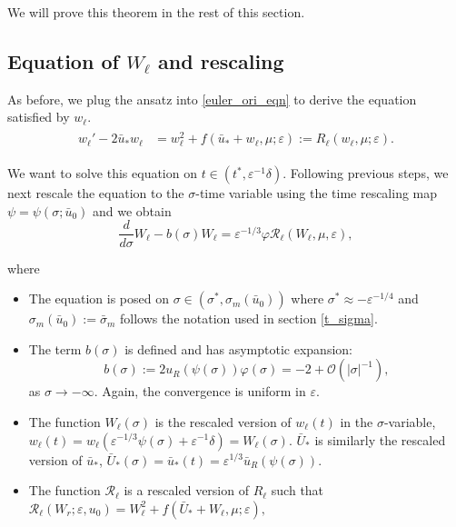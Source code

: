 \documentclass[letterpaper,11pt]{article}
\newcommand{\Ral}{\mathcal{R}}
\newcommand{\rmO}{\mathcal{O}}
\newcommand{\eps}{\varepsilon}
\numberwithin{equation}{section}
\theoremstyle{plain}
\begin{document}
We will prove this theorem in the rest of this section.
\subsection{Equation of \texorpdfstring{$W_{\ell}$}{Well} and rescaling}

As before, we plug the ansatz into \eqref{euler_ori_eqn} to derive the equation satisfied by $w_\ell$.
\begin{align}\label{Eqn_wl}
\begin{split}
w_{\ell}' -2\bar{u}_* w_\ell &= w_\ell^2 + f(\bar{u}_*+w_\ell, \mu; \eps):=R_\ell(w_\ell,\mu;\eps).
\end{split}
\end{align}

We want to solve this equation on $t\in (t^*, \eps^{-1}\delta)$. 
Following previous steps, we next rescale the equation to the $\sigma$-time variable using the time rescaling map $\psi = \psi(\sigma; \bar{u}_0)$ and we obtain
\begin{equation}\label{rescl_wl}
\frac{d}{d\sigma} W_\ell - b(\sigma)W_\ell = \eps^{-1/3}\varphi \Ral_\ell(W_\ell,\mu,\eps),
\end{equation}

where 
\begin{itemize}
\item The equation is posed on $\sigma \in (\sigma^*, \sigma_m(\bar{u}_0))$ where $\sigma^* \approx -\eps^{-1/4}$ and $\sigma_m(\bar{u}_0) := \bar{\sigma}_m$ follows the notation used in section \ref{t_sigma}.

\item The term $b(\sigma)$ is defined and has asymptotic expansion:
\[
b(\sigma) := 2u_R(\psi(\sigma))\varphi(\sigma) = -2 + \rmO(|\sigma|^{-1}),
\]
as $\sigma \to -\infty$. Again, the convergence is uniform in $\eps$.

\item The function $W_\ell(\sigma)$ is the rescaled version of $w_\ell(t)$ in the $\sigma$-variable, $w_\ell(t) = w_\ell(\eps^{-1/3}\psi(\sigma)+\eps^{-1}\delta) = W_\ell(\sigma)$. $\bar{U}_*$ is similarly the rescaled version of $\bar{u}_*$,  $\bar{U}_*(\sigma)= \bar{u}_*(t) = \eps^{1/3}\bar{u}_R(\psi(\sigma ) )$.

\item The function $\Ral_\ell$ is a rescaled version of $R_\ell$ such that $\Ral_\ell(W_r;\eps,u_0) = W_\ell^2 + f(\bar{U}_*+W_\ell, \mu;\eps),$ 
\end{itemize}
\end{document}
